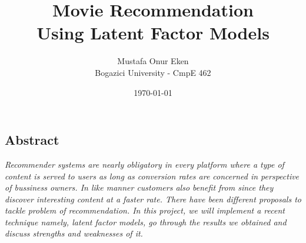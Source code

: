 \documentclass[11pt]{article}
\begin{document}

\title{\huge \textbf{Movie Recommendation\\ Using Latent Factor Models}}
\author{\Large Mustafa Onur Eken\\[1mm] Bogazici University - CmpE 462}
\date{\today}

\maketitle
\begin{center}
	\section*{\large Abstract}
	\textit{Recommender systems are nearly obligatory in every platform where a type of content is served to users as long as conversion rates are concerned in perspective of bussiness owners. In like manner customers also benefit from since they discover interesting content at a faster rate. There have been different proposals to tackle problem of recommendation. In this project, we will implement a recent technique namely, latent factor models, go through the results we obtained and discuss strengths and weaknesses of it.}	
\end{center}
\vspace{10mm}
\end{document}
